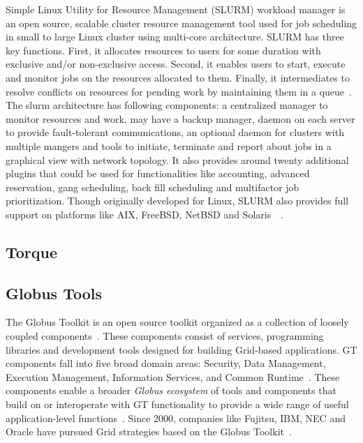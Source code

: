 Simple Linux Utility for Resource Management (SLURM) workload manager
is an open source, scalable cluster resource management tool used for
job scheduling in small to large Linux cluster using multi-core
architecture. SLURM has three key functions. First, it allocates
resources to users for some duration with exclusive and/or
non-exclusive access. Second, it enables users to start, execute and
monitor jobs on the resources allocated to them. Finally, it
intermediates to resolve conflicts on resources for pending work by
maintaining them in a queue~\cite{www-slurmSchedmdSite}. The slurm
architecture has following components: a centralized manager to
monitor resources and work, may have a backup manager, daemon on each
server to provide fault-tolerant communications, an optional daemon
for clusters with multiple mangers and tools to initiate, terminate
and report about jobs in a graphical view with network topology. It
also provides around twenty additional plugins that could be used for
functionalities like accounting, advanced reservation, gang
scheduling, back fill scheduling and multifactor job
prioritization. Though originally developed for Linux, SLURM also
provides full support on platforms like AIX, FreeBSD, NetBSD and
Solaris~\cite{www-slurmPlatformsSite}~\cite{www-slurm}.

     \pv
     
\subsection{Torque}

\pv 

\subsection{Globus Tools \cv}

The Globus Toolkit is an open source toolkit organized as a collection
of loosely coupled components~\cite{sotomayor2006globus}. These
components consist of services, programming libraries and development
tools designed for building Grid-based applications. GT components
fall into five broad domain areas: Security, Data Management,
Execution Management, Information Services, and Common
Runtime~\cite{foster2006globus}. These components enable a broader
\textit{Globus ecosystem} of tools and components that build on or
interoperate with GT functionality to provide a wide range of useful
application-level functions~\cite{www-about-globus}. Since 2000,
companies like Fujitsu, IBM, NEC and Oracle have pursued Grid
strategies based on the Globus Toolkit~\cite{www-about-globus}.

